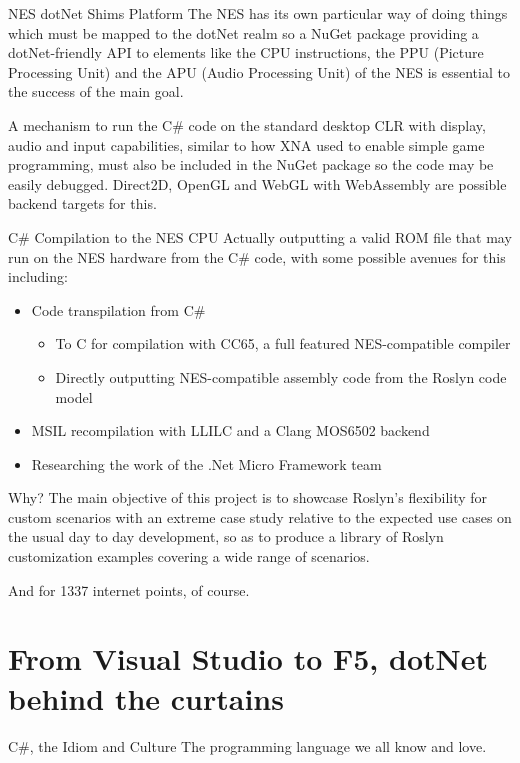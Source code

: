 \documentclass[10pt]{beamer}
\begin{document}
\begin{frame}{NES dotNet Shims Platform}
The NES has its own particular way of doing things which must be mapped to the dotNet realm so a NuGet package providing a dotNet-friendly API to elements like the CPU instructions, the PPU (Picture Processing Unit) and the APU (Audio Processing Unit) of the NES is essential to the success of the main goal. 

A mechanism to run the C\# code on the standard desktop CLR with display, audio and input capabilities, similar to how XNA used to enable simple game programming, must also be included in the NuGet package so the code may be easily debugged. Direct2D, OpenGL and WebGL with WebAssembly are possible backend targets for this.
\end{frame}

\begin{frame}{C\# Compilation to the NES CPU}
Actually outputting a valid ROM file that may run on the NES hardware from the C\# code, with some possible avenues for this including:
\begin{itemize}
    \item Code transpilation from C\# 
    \begin{itemize}
        \item To C for compilation with CC65, a full featured NES-compatible compiler
        \item Directly outputting NES-compatible assembly code from the Roslyn code model
    \end{itemize}
    \item MSIL recompilation with LLILC and a Clang MOS6502 backend
    \item Researching the work of the .Net Micro Framework team
\end{itemize}
\end{frame}

\begin{frame}{Why?}
The main objective of this project is to showcase Roslyn's flexibility for custom scenarios with an extreme case study relative to the expected use cases on the usual day to day development, so as to produce a library of Roslyn customization examples covering a wide range of scenarios. 

And for 1337 internet points, of course.
\end{frame}

\section{From Visual Studio to F5, dotNet behind the curtains}
\begin{frame}{C\#, the Idiom and Culture}
The programming language we all know and love.
\end{frame}
\end{document}
